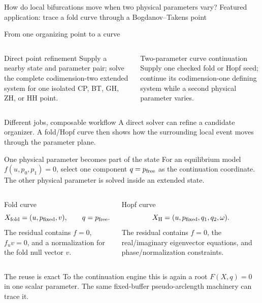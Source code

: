   {How do local bifurcations move when two physical parameters vary?}
  {Featured application: trace a fold curve through a Bogdanov--Takens point}

\begin{frame}{From one organizing point to a curve}
\releasedbadge
\small
\begin{columns}[T,onlytextwidth]
\begin{block}{Direct point refinement}
Supply a nearby state and parameter pair; solve the complete codimension-two
extended system for one isolated CP, BT, GH, ZH, or HH point.
\end{block}
\begin{block}{Two-parameter curve continuation}
Supply one checked fold or Hopf seed; continue its codimension-one defining
system while a second physical parameter varies.
\end{block}
\end{columns}
\vfill
\begin{alertblock}{Different jobs, composable workflow}
A direct solver can refine a candidate organizer. A fold/Hopf curve then shows
how the surrounding local event moves through the parameter plane.
\end{alertblock}
\end{frame}

\begin{frame}{One physical parameter becomes part of the state}
\small
For an equilibrium model $f(u,p_0,p_1)=0$, select one component
$q=p_{\rm free}$ as the continuation coordinate. The other physical
parameter is solved inside an extended state.
\vspace{3mm}
\begin{columns}[T,onlytextwidth]
\begin{block}{Fold curve}
\[
X_{\rm fold}=(u,p_{\rm fixed},v),
\qquad q=p_{\rm free}.
\]
The residual contains $f=0$, $f_u v=0$, and a normalization for the fold
null vector $v$.
\end{block}
\begin{block}{Hopf curve}
\[
X_{\rm H}=(u,p_{\rm fixed},q_1,q_2,\omega).
\]
The residual contains $f=0$, the real/imaginary eigenvector equations, and
phase/normalization constraints.
\end{block}
\end{columns}
\vfill
\begin{alertblock}{The reuse is exact}
To the continuation engine this is again a root $F(X,q)=0$ in one scalar
parameter. The same fixed-buffer pseudo-arclength machinery can trace it.
\end{alertblock}
\end{frame}

